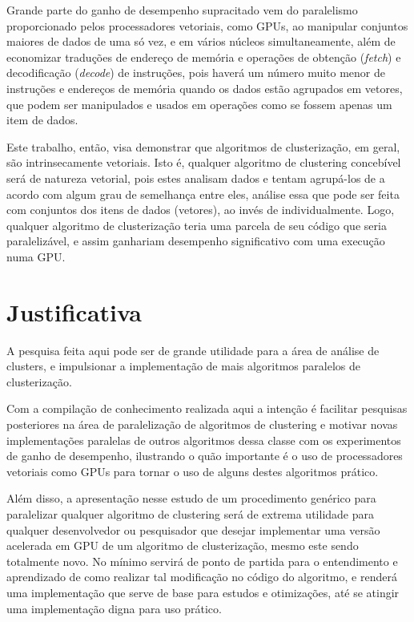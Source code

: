 \documentclass[12pt, %
openright, 
oneside, %
a4paper,    %
brazil]{facom-ufu-abntex2}
\begin{document}
Grande parte do ganho de desempenho supracitado vem do paralelismo proporcionado pelos processadores vetoriais, como GPUs, ao manipular conjuntos maiores de dados de uma só vez, e em vários núcleos simultaneamente, além de economizar traduções de endereço de memória e operações de obtenção (\textit{fetch}) e decodificação (\textit{decode}) de instruções, pois haverá um número muito menor de instruções e endereços de memória quando os dados estão agrupados em vetores, que podem ser manipulados e usados em operações como se fossem apenas um item de dados.

Este trabalho, então, visa demonstrar que algoritmos de clusterização, em geral, são intrinsecamente vetoriais. Isto é, qualquer algoritmo de clustering concebível será de natureza vetorial, pois estes analisam dados e tentam agrupá-los de a acordo com algum grau de semelhança entre eles, análise essa que pode ser feita com conjuntos dos itens de dados (vetores), ao invés de individualmente. Logo, qualquer algoritmo de clusterização teria uma parcela de seu código que seria paralelizável, e assim ganhariam desempenho significativo com uma execução numa GPU.


\section{Justificativa}

A pesquisa feita aqui pode ser de grande utilidade para a área de análise de clusters, e impulsionar a implementação de mais algoritmos paralelos de clusterização.

Com a compilação de conhecimento realizada aqui a intenção é facilitar pesquisas posteriores na área de paralelização de algoritmos de clustering e motivar novas implementações paralelas de outros algoritmos dessa classe com os experimentos de ganho de desempenho, ilustrando o quão importante é o uso de processadores vetoriais como GPUs para tornar o uso de alguns destes algoritmos prático.

Além disso, a apresentação nesse estudo de um procedimento genérico para paralelizar qualquer algoritmo de clustering será de extrema utilidade para qualquer desenvolvedor ou pesquisador que desejar implementar uma versão acelerada em GPU de um algoritmo de clusterização, mesmo este sendo totalmente novo. No mínimo servirá de ponto de partida para o entendimento e aprendizado de como realizar tal modificação no código do algoritmo, e renderá uma implementação que serve de base para estudos e otimizações, até se atingir uma implementação digna para uso prático.
\end{document}
